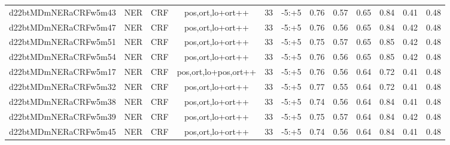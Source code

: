 \documentclass[a4paper]{article}
\begin{document}
\begin{landscape}
\begin{center}
\begin{tabular}{ |c|c|c|c|c|c|c|c|c|c|c|c|}
 
 	
 	\small{ d22btMDmNERaCRFw5m43 } & \small{ NER} & \small{  CRF }  & pos,ort,lo+ort++  &  33 &  \small{  -5:+5 }  &  0.76 & 0.57 & 0.65  &  0.84 & 0.41 & 0.48 \\
 	

 
 	
 	\small{ d22btMDmNERaCRFw5m47 } & \small{ NER} & \small{  CRF }  & pos,ort,lo+ort++  &  33 &  \small{  -5:+5 }  &  0.76 & 0.56 & 0.65  &  0.84 & 0.42 & 0.48 \\
 	

 
 	
 	\small{ d22btMDmNERaCRFw5m51 } & \small{ NER} & \small{  CRF }  & pos,ort,lo+ort++  &  33 &  \small{  -5:+5 }  &  0.75 & 0.57 & 0.65  &  0.85 & 0.42 & 0.48 \\
 	

 
 	
 	\small{ d22btMDmNERaCRFw5m54 } & \small{ NER} & \small{  CRF }  & pos,ort,lo+ort++  &  33 &  \small{  -5:+5 }  &  0.76 & 0.56 & 0.65  &  0.85 & 0.42 & 0.48 \\
 	

 
 	
 	\small{ d22btMDmNERaCRFw5m17 } & \small{ NER} & \small{  CRF }  & pos,ort,lo+pos,ort++  &  33 &  \small{  -5:+5 }  &  0.76 & 0.56 & 0.64  &  0.72 & 0.41 & 0.48 \\
 	

 
 	
 	\small{ d22btMDmNERaCRFw5m32 } & \small{ NER} & \small{  CRF }  & pos,ort,lo+ort++  &  33 &  \small{  -5:+5 }  &  0.77 & 0.55 & 0.64  &  0.72 & 0.41 & 0.48 \\
 	

 
 	
 	\small{ d22btMDmNERaCRFw5m38 } & \small{ NER} & \small{  CRF }  & pos,ort,lo+ort++  &  33 &  \small{  -5:+5 }  &  0.74 & 0.56 & 0.64  &  0.84 & 0.41 & 0.48 \\
 	

 
 	
 	\small{ d22btMDmNERaCRFw5m39 } & \small{ NER} & \small{  CRF }  & pos,ort,lo+ort++  &  33 &  \small{  -5:+5 }  &  0.75 & 0.57 & 0.64  &  0.84 & 0.42 & 0.48 \\
 	

 
 	
 	\small{ d22btMDmNERaCRFw5m45 } & \small{ NER} & \small{  CRF }  & pos,ort,lo+ort++  &  33 &  \small{  -5:+5 }  &  0.74 & 0.56 & 0.64  &  0.84 & 0.41 & 0.48 \\
 	


\end{tabular}
\end{center}
\end{landscape}
\end{document}
